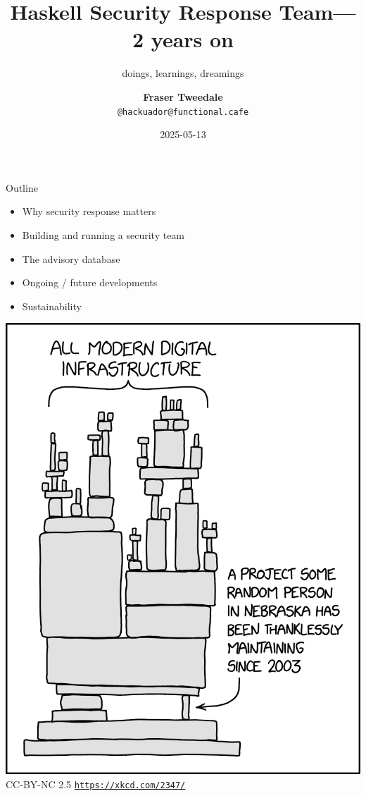 \documentclass[ignorenonframetext,aspectratio=169,12pt]{beamer}
\title{\bf Haskell Security Response Team---2 years on}
\subtitle{doings, learnings, dreamings}
\author{{\bf Fraser Tweedale}\\
    \texttt{@hackuador@functional.cafe}}
\date{2025-05-13}
\makeatletter
\def\maxheight{\ifdim\Gin@nat@height>\textheight\textheight\else\Gin@nat@height\fi}
\makeatother
\begin{document}
\frame{\titlepage}

\begin{frame}{Outline}
    \begin{itemize}
        \item Why security response matters
        \item Building and running a security team
        \item The advisory database
        \item Ongoing / future developments
        \item Sustainability
    \end{itemize}
\end{frame}


\begin{frame}[plain]
\begin{center}
    \includegraphics[height=0.9\maxheight,keepaspectratio]{dependency_2x.png}
    \\
    \tiny
    CC-BY-NC 2.5 \texttt{\url{https://xkcd.com/2347/}}
\end{center}
\end{frame}
\end{document}
